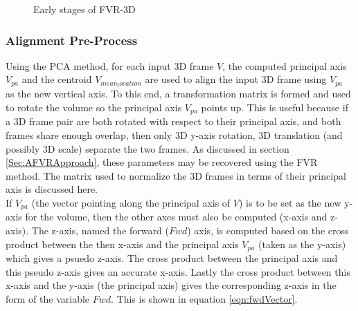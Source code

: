 \begin{figure}[!htb]
       \caption{Early stages of FVR-3D}
       \label{fig:FVR3D111}
\end{figure}



\subsubsection{Alignment Pre-Process}

Using the PCA method, for each input 3D frame $V$, the computed principal axis $V_{pa}$ and the centroid $V_{mean_location}$ are used to align the input 3D frame using $V_{pa}$ as the new vertical axis. To this end, a transformation matrix is formed and used to rotate the volume so the principal axis $V_{pa}$ points up. This is useful because if a 3D frame pair are both rotated with respect to their principal axis, and both frames share enough overlap, then only 3D y-axis rotation, 3D translation (and possibly 3D scale) separate the two frames. As discussed in section \ref{Sec:AFVRApproach}, these parameters may be recovered using the FVR method. The matrix used to normalize the 3D frames in terms of their principal axis is discussed here. \\

If $V_{pa}$ (the vector pointing along the principal axis of $V$) is to be set as the new y-axis for the volume, then the other axes must also be computed (x-axis and z-axis). The z-axis, named the forward ($Fwd$) axis, is computed based on the cross product between the then x-axis and the principal axis $V_{pa}$ (taken as the y-axis) which gives a psuedo z-axis. The cross product between the principal axis and this pseudo z-axis gives an accurate x-axis. Lastly the cross product between this x-axis and the y-axis (the principal axis) gives the corresponding z-axis in the form of the variable $Fwd$. This is shown in equation \ref{eqn:fwdVector}. \\


